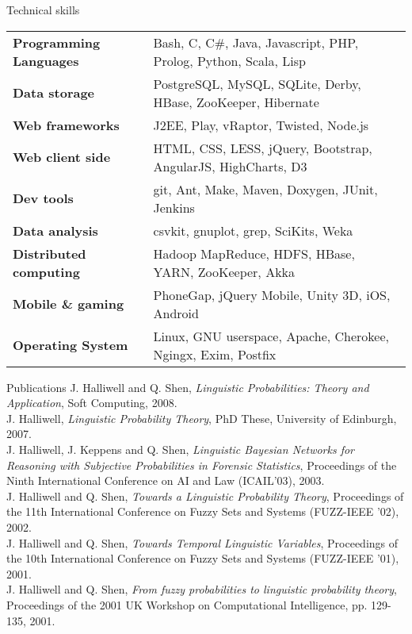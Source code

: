 \documentclass{resume} %
\begin{document}
\begin{rSection}{Technical skills}

\begin{tabular}{ @{} >{\bfseries}l @{\hspace{6ex}} l }
Programming Languages & Bash, C, C\#, Java, Javascript, PHP, Prolog, Python, Scala, Lisp \\
Data storage & PostgreSQL, MySQL, SQLite, Derby, HBase, ZooKeeper, Hibernate \\
Web frameworks & J2EE, Play, vRaptor, Twisted, Node.js \\
Web client side & HTML, CSS, LESS, jQuery, Bootstrap, AngularJS, HighCharts, D3 \\
Dev tools & git, Ant, Make, Maven, Doxygen, JUnit, Jenkins \\
Data analysis & csvkit, gnuplot, grep, SciKits, Weka \\
Distributed computing & Hadoop MapReduce, HDFS, HBase, YARN, ZooKeeper, Akka \\
Mobile \& gaming & PhoneGap, jQuery Mobile, Unity 3D, iOS, Android \\
Operating System & Linux, GNU userspace, Apache, Cherokee, Ngingx, Exim, Postfix
\end{tabular}

\end{rSection}


\begin{rSection}{Publications}
J. Halliwell and Q. Shen, {\em Linguistic Probabilities: Theory and Application}, Soft Computing, 2008.\\
J. Halliwell, {\em Linguistic Probability Theory}, PhD These, University of Edinburgh, 2007.\\
J. Halliwell, J. Keppens and Q. Shen, {\em Linguistic Bayesian Networks for Reasoning with
Subjective Probabilities in Forensic Statistics}, Proceedings of the Ninth International
Conference on AI and Law (ICAIL'03), 2003.\\
J. Halliwell and Q. Shen, {\em Towards a Linguistic Probability Theory}, Proceedings of the
11th International Conference on Fuzzy Sets and Systems (FUZZ-IEEE '02), 2002.\\
J. Halliwell and Q. Shen, {\em Towards Temporal Linguistic Variables}, Proceedings of the
10th International Conference on Fuzzy Sets and Systems (FUZZ-IEEE '01), 2001.\\
J. Halliwell and Q. Shen, {\em From fuzzy probabilities to linguistic probability theory},
Proceedings of the 2001 UK Workshop on Computational Intelligence, pp. 129-135,
2001.\\
\end{rSection}
\end{document}
